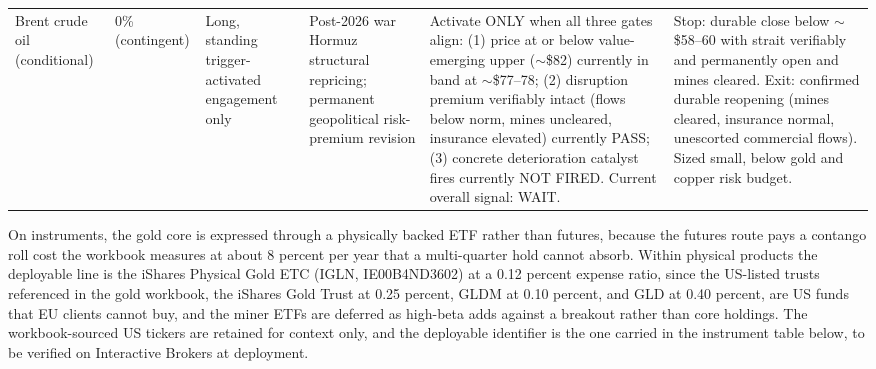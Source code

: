 \documentclass[11pt,a4paper]{article}
\begin{document}
\begin{small}
\begin{longtable}{P{1.9cm} P{1.2cm} P{1.75cm} P{2.25cm} P{3.0cm} P{3.0cm}}
\midrule
Brent crude oil (conditional) & 0\% (contingent) & Long, standing trigger-activated engagement only & Post-2026 war Hormuz structural repricing; permanent geopolitical risk-premium revision & Activate ONLY when all three gates align: (1) price at or below value-emerging upper (\(\sim\)\$82) currently in band at \(\sim\)\$77--78; (2) disruption premium verifiably intact (flows below norm, mines uncleared, insurance elevated) currently PASS; (3) concrete deterioration catalyst fires currently NOT FIRED. Current overall signal: WAIT. & Stop: durable close below \(\sim\)\$58--60 with strait verifiably and permanently open and mines cleared. Exit: confirmed durable reopening (mines cleared, insurance normal, unescorted commercial flows). Sized small, below gold and copper risk budget. \\
\end{longtable}
\end{small}

On instruments, the gold core is expressed through a physically backed ETF rather than futures, because the futures route pays a contango roll cost the workbook measures at about 8 percent per year that a multi-quarter hold cannot absorb. Within physical products the deployable line is the iShares Physical Gold ETC (IGLN, IE00B4ND3602) at a 0.12 percent expense ratio, since the US-listed trusts referenced in the gold workbook, the iShares Gold Trust at 0.25 percent, GLDM at 0.10 percent, and GLD at 0.40 percent, are US funds that EU clients cannot buy, and the miner ETFs are deferred as high-beta adds against a breakout rather than core holdings. The workbook-sourced US tickers are retained for context only, and the deployable identifier is the one carried in the instrument table below, to be verified on Interactive Brokers at deployment.
\end{document}

